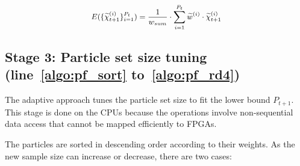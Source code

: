 \begin{equation}
\small
\begin{aligned}
E(\{\widetilde{\chi}_{t+1}^{(i)}\}^{P_t}_{i=1}) = \frac{1}{w_{sum}} \cdot \sum_{i=1}^{P_{t}} \widetilde{w}^{(i)} \cdot \widetilde{\chi}_{t+1}^{(i)}
\end{aligned}
\label{eqt:bound8}
\end{equation}

\subsection{Stage 3: Particle set size tuning (line~\ref{algo:pf_sort} to~\ref{algo:pf_rd4})} 
The adaptive approach tunes the particle set size to fit the lower bound $P_{t+1}$.
This stage is done on the CPUs because the operations involve non-sequential data access that cannot be mapped efficiently to FPGAs.

The particles are sorted in descending order according to their weights.
As the new sample size can increase or decrease, there are two cases:

